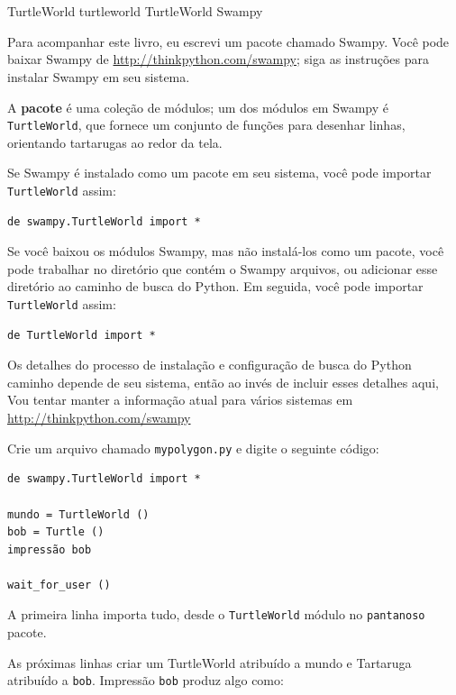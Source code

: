 \documentclass[10pt]{book}
\begin{document}
\section{} TurtleWorld
\label{} turtleworld
\index{} TurtleWorld
\index{} Swampy

Para acompanhar este livro, eu escrevi um pacote chamado Swampy.
Você pode baixar Swampy de \url{http://thinkpython.com/swampy};
siga as instruções para instalar Swampy em seu sistema.

A {\bf pacote} é uma coleção de módulos; um dos módulos em
Swampy é {\tt TurtleWorld}, que fornece um conjunto de funções para
desenhar linhas, orientando tartarugas ao redor da tela.

Se Swampy é instalado como um pacote em seu sistema, você pode importar
{\tt TurtleWorld} assim:

\begin{verbatim}
de swampy.TurtleWorld import *
\end{verbatim}

Se você baixou os módulos Swampy, mas não instalá-los como um
pacote, você pode trabalhar no diretório que contém o Swampy
arquivos, ou adicionar esse diretório ao caminho de busca do Python. Em seguida, você pode importar
{\tt TurtleWorld} assim:

\begin{verbatim}
de TurtleWorld import *
\end{verbatim}

Os detalhes do processo de instalação e configuração de busca do Python
caminho depende de seu sistema, então ao invés de incluir esses detalhes aqui,
Vou tentar manter a informação atual para vários sistemas
em \url{http://thinkpython.com/swampy}

Crie um arquivo chamado {\tt mypolygon.py} e digite o seguinte
código:

\begin{verbatim}
de swampy.TurtleWorld import *

mundo = TurtleWorld ()
bob = Turtle ()
impressão bob

wait_for_user ()
\end{verbatim}
%
A primeira linha importa tudo, desde o {\tt TurtleWorld} módulo
no {\tt pantanoso} pacote.

As próximas linhas criar um TurtleWorld atribuído a {mundo \tt} e
Tartaruga atribuído a {\tt bob}. Impressão {\tt bob} produz algo
como:
\end{document}
